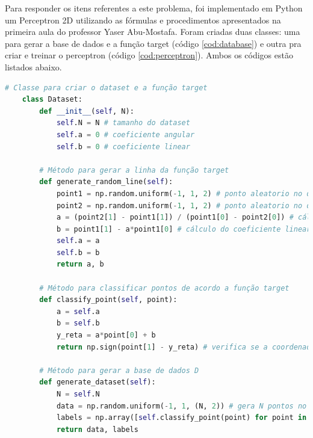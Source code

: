 Para responder os itens referentes a este problema, foi implementado em Python um Perceptron 2D utilizando as fórmulas e procedimentos apresentados na primeira aula do professor Yaser Abu-Mostafa. Foram criadas duas classes: uma para gerar a base de dados e a função target (código \ref{cod:database}) e outra pra criar e treinar o perceptron (código \ref{cod:perceptron}). Ambos os códigos estão listados abaixo.

\begin{lstlisting}[language=Python, caption=Geração do da base de dados $D$, label=cod:database]
    # Classe para criar o dataset e a função target
    class Dataset:
        def __init__(self, N): 
            self.N = N # tamanho do dataset
            self.a = 0 # coeficiente angular
            self.b = 0 # coeficiente linear

        # Método para gerar a linha da função target
        def generate_random_line(self):
            point1 = np.random.uniform(-1, 1, 2) # ponto aleatorio no domínio
            point2 = np.random.uniform(-1, 1, 2) # ponto aleatorio no domínio
            a = (point2[1] - point1[1]) / (point1[0] - point2[0]) # cálculo do coeficiente angular
            b = point1[1] - a*point1[0] # cálculo do coeficiente linear
            self.a = a
            self.b = b
            return a, b

        # Método para classificar pontos de acordo a função target
        def classify_point(self, point):
            a = self.a
            b = self.b
            y_reta = a*point[0] + b    
            return np.sign(point[1] - y_reta) # verifica se a coordenada y do ponto está acima ou abaixo da reta

        # Método para gerar a base de dados D
        def generate_dataset(self):
            N = self.N
            data = np.random.uniform(-1, 1, (N, 2)) # gera N pontos no R2 com coordenadas entre [-1, 1]
            labels = np.array([self.classify_point(point) for point in data])
            return data, labels
\end{lstlisting}

